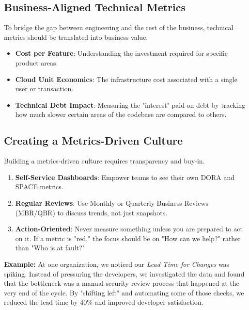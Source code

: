 
\subsection{Business-Aligned Technical Metrics}
To bridge the gap between engineering and the rest of the business, technical metrics should be translated into business value.
\begin{itemize}
    \item \textbf{Cost per Feature}: Understanding the investment required for specific product areas.
    \item \textbf{Cloud Unit Economics}: The infrastructure cost associated with a single user or transaction.
    \item \textbf{Technical Debt Impact}: Measuring the "interest" paid on debt by tracking how much slower certain areas of the codebase are compared to others.
\end{itemize}

\subsection{Creating a Metrics-Driven Culture}
Building a metrics-driven culture requires transparency and buy-in.
\begin{enumerate}
    \item \textbf{Self-Service Dashboards}: Empower teams to see their own DORA and SPACE metrics.
    \item \textbf{Regular Reviews}: Use Monthly or Quarterly Business Reviews (MBR/QBR) to discuss trends, not just snapshots.
    \item \textbf{Action-Oriented}: Never measure something unless you are prepared to act on it. If a metric is "red," the focus should be on "How can we help?" rather than "Who is at fault?"
\end{enumerate}

\textbf{Example:} At one organization, we noticed our \textit{Lead Time for Changes} was spiking. Instead of pressuring the developers, we investigated the data and found that the bottleneck was a manual security review process that happened at the very end of the cycle. By "shifting left" and automating some of those checks, we reduced the lead time by 40\% and improved developer satisfaction.

